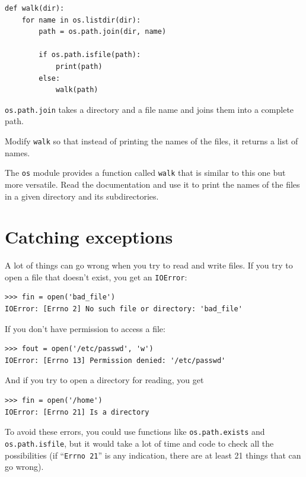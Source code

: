 \documentclass[10pt]{book}
\begin{document}

\beforeverb
\begin{verbatim}
def walk(dir):
    for name in os.listdir(dir):
        path = os.path.join(dir, name)

        if os.path.isfile(path):
            print(path)
        else:
            walk(path)
\end{verbatim}
\afterverb
%
{\tt os.path.join} takes a directory and a file name and joins
them into a complete path.  

\begin{ex}
Modify {\tt walk} so that instead of printing the names of
the files, it returns a list of names.
\end{ex}

\begin{ex}
The {\tt os} module provides a function called {\tt walk}
that is similar to this one but more versatile.  Read
the documentation and use it to print the names of the
files in a given directory and its subdirectories.
\end{ex}


\section{Catching exceptions}
\label{catch}

A lot of things can go wrong when you try to read and write
files.  If you try to open a file that doesn't exist, you get an
{\tt IOError}:


\beforeverb
\begin{verbatim}
>>> fin = open('bad_file')
IOError: [Errno 2] No such file or directory: 'bad_file'
\end{verbatim}
\afterverb
%
If you don't have permission to access a file:


\beforeverb
\begin{verbatim}
>>> fout = open('/etc/passwd', 'w')
IOError: [Errno 13] Permission denied: '/etc/passwd'
\end{verbatim}
\afterverb
%
And if you try to open a directory for reading, you get

\beforeverb
\begin{verbatim}
>>> fin = open('/home')
IOError: [Errno 21] Is a directory
\end{verbatim}
\afterverb
%
To avoid these errors, you could use functions like {\tt os.path.exists}
and {\tt os.path.isfile}, but it would take a lot of time and code
to check all the possibilities (if ``{\tt Errno 21}'' is any
indication, there are at least 21 things that can go wrong).
\end{document}
